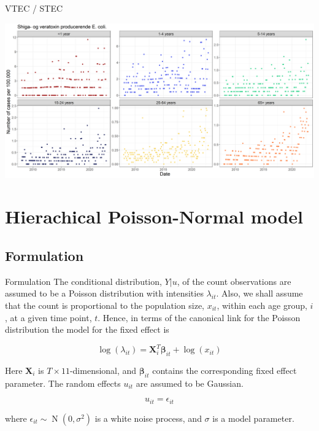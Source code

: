 \documentclass[aspectratio=169]{beamer}
\DeclareMathOperator{\N}{N}
\begin{document}
\begin{frame}{VTEC / STEC}
\protect\hypertarget{vtec-stec-2}{}
\tiny

\includegraphics[width=1\linewidth]{../figures/ShigaogveratoxinproducerendeEcolixAgeGroup}

\normalsize
\end{frame}

\hypertarget{hierachical-poisson-normal-model}{%
\section{Hierachical Poisson-Normal
model}\label{hierachical-poisson-normal-model}}

\hypertarget{formulation}{%
\subsection{Formulation}\label{formulation}}

\begin{frame}{Formulation}
The conditional distribution, \(Y|u\), of the count observations are
assumed to be a Poisson distribution with intensities \(\lambda_{it}\).
Also, we shall assume that the count is proportional to the population
size, \(x_{it}\), within each age group, \(i\), at a given time point,
\(t\). Hence, in terms of the canonical link for the Poisson
distribution the model for the fixed effect is

\begin{equation}
  \log(\lambda_{it})=\mathbf{X}_i^T\mathbf{\beta}_{it}+\log(x_{it})
\end{equation}

Here \(\mathbf{X}_i\) is \(T\times11\)-dimensional, and
\(\mathbf{\beta}_{it}\) contains the corresponding fixed effect
parameter. The random effects \(u_{it}\) are assumed to be Gaussian.

\begin{equation}
  u_{it} = \epsilon_{it}
\end{equation}

where \(\epsilon_{it}\sim\N(0,\sigma^2)\) is a white noise process, and
\(\sigma\) is a model parameter.
\end{frame}
\end{document}
